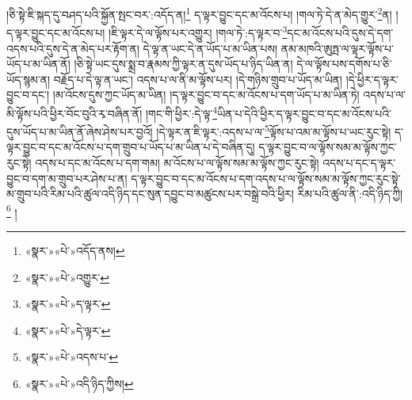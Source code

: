 །ཅི་སྟེ་ཇི་སྐད་དུ་བཤད་པའི་སྐྱོན་སྤང་བར་:འདོད་ན།\footnote{«སྣར་»«པེ་»འདོད་ནས།} ད་ལྟར་བྱུང་དང་མ་འོངས་པ། །གལ་ཏེ་དེ་ན་མེད་གྱུར་\footnote{«སྣར་»«པེ་»འགྱུར་}ན། །ད་ལྟར་བྱུང་དང་མ་འོངས་པ། །ཇི་ལྟར་དེ་ལ་ལྟོས་པར་འགྱུར། །གལ་ཏེ་:ད་ལྟར་བ་\footnote{«སྣར་»«པེ་»ད་ལྟར་}དང་མ་འོངས་པའི་དུས་དེ་དག་འདས་པའི་དུས་དེ་ན་མེད་པར་རྟོག་ན། དེ་ལྟ་ན་ཡང་དེ་ན་ཡོད་པ་མ་ཡིན་པས། ནམ་མཁའི་ཨུཏྤ་ལ་ལྟར་ལྟོས་པ་ཡོད་པ་མ་ཡིན་ནོ། །ཅི་སྟེ་ཡང་དུས་སྨྲ་བ་རྣམས་ཀྱི་ལྟར་ན་དུས་ཡོད་པ་ཉིད་ཡིན་ན། དེ་ལ་ལྟོས་པས་དགོས་པ་ཅི་ཡོད་སྙམ་ན། བརྗོད་པ་དེ་ལྟ་ན་ཡང་། འདས་པ་ལ་ནི་མ་ལྟོས་པར། །དེ་གཉིས་གྲུབ་པ་ཡོད་མ་ཡིན། །དེ་ཕྱིར་ད་ལྟར་བྱུང་བ་དང་། །མ་འོངས་དུས་ཀྱང་ཡོད་མ་ཡིན། །ད་ལྟར་བྱུང་བ་དང་མ་འོངས་པ་དག་ཡོད་པ་མ་ཡིན་ཏེ། འདས་པ་ལ་མི་ལྟོས་པའི་ཕྱིར་བོང་བུའི་རྭ་བཞིན་ནོ། །གང་གི་ཕྱིར་:དེ་ལྟ་\footnote{«སྣར་»«པེ་»དེ་ལྟར་}ཡིན་པ་དེའི་ཕྱིར་ད་ལྟར་བྱུང་བ་དང་མ་འོངས་པའི་དུས་ཡོད་པ་མ་ཡིན་ནོ་ཞེས་ཤེས་པར་བྱའོ། །དེ་ལྟར་ན་ཇི་ལྟར་:འདས་པ་ལ་\footnote{«སྣར་»«པེ་»འདས་པ་}ལྟོས་པ་འམ་མ་ལྟོས་པ་ཡང་རུང་སྟེ། ད་ལྟར་བྱུང་བ་དང་མ་འོངས་པ་དག་གྲུབ་པ་ཡོད་པ་མ་ཡིན་པ་དེ་བཞིན་དུ། ད་ལྟར་བྱུང་བ་ལ་ལྟོས་སམ་མ་ལྟོས་ཀྱང་རུང་སྟེ། འདས་པ་དང་མ་འོངས་པ་དག་གམ། མ་འོངས་པ་ལ་ལྟོས་སམ་མ་ལྟོས་ཀྱང་རུང་སྟེ། འདས་པ་དང་ད་ལྟར་བྱུང་བ་དག་མ་གྲུབ་པར་ཤེས་པ་ན། ད་ལྟར་བྱུང་བ་དང་མ་འོངས་པ་དག་འདས་པ་ལ་ལྟོས་སམ་མ་ལྟོས་ཀྱང་རུང་སྟེ་མ་གྲུབ་པའི་རིམ་པའི་ཚུལ་འདི་ཉིད་དང་སུན་དབྱུང་བ་མཚུངས་པར་བསྒྲེ་བའི་ཕྱིར། རིམ་པའི་ཚུལ་ནི་:འདི་ཉིད་ཀྱི།\footnote{«སྣར་»«པེ་»འདི་ཉིད་ཀྱིས།} །
